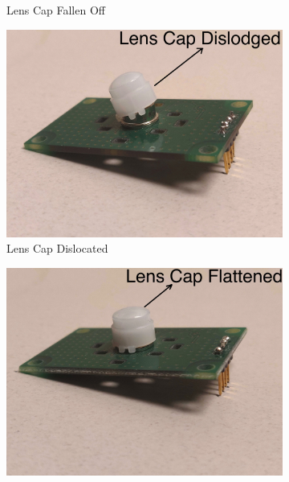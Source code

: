 \begin{figure}
\begin{subfigure}[t]{0.24\textwidth}
		\caption{Lens Cap Fallen Off}
		\label{fig:failure_photo1}
	\end{subfigure}
	\hspace{0.10ex}
	\begin{subfigure}[t]{0.24\textwidth}
		\centering
		\includegraphics[width=\textwidth]{figures/platform/failure_photographs/ClassI-LensCapDislogdged-annotated-jpg.jpg}
		\caption{\footnotesize Lens Cap Dislocated}
		\label{fig:failure_photo2}
	\end{subfigure}	
	\hspace{0.10ex}
	\begin{subfigure}[t]{0.24\textwidth}
		\centering
		\includegraphics[width=\textwidth]{figures/platform/failure_photographs/ClassII-LensCapDeformed-annotated-jpg.jpg}

\end{subfigure}
\end{figure}
